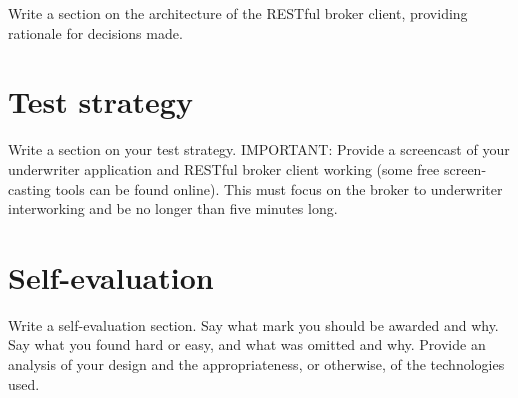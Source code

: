 \documentclass[10pt,a4paper,headinclude=true,twoside]{report}
\begin{document}
  

Write a section on the architecture of the RESTful broker client,
providing rationale for decisions made.
\section{Test strategy}
Write a section on your test strategy. IMPORTANT: Provide a
screencast of your underwriter application and RESTful broker client
working (some free screen-casting tools can be found online). This
must focus on the broker to underwriter interworking and be no longer
than five minutes long.
\section{Self-evaluation}
Write a self-evaluation section. Say what mark you should be awarded
and why. Say what you found hard or easy, and what was omitted and
why. Provide an analysis of your design and the appropriateness, or
otherwise, of the technologies used.



\end{document}
